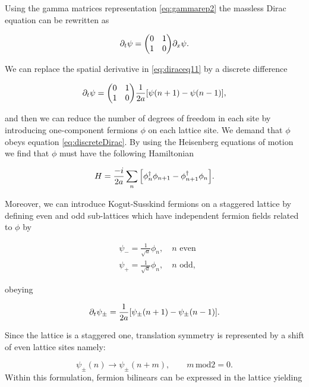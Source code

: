 Using the gamma matrices representation \eqref{eq:gammarep2} the massless Dirac equation can be rewritten as

\begin{equation}
    \partial_t \psi =   \mqty(\admat[0]{1,1})\partial_x \psi.\label{eq:diraceq11}
\end{equation}

We can replace the spatial derivative  in \eqref{eq:diraceq11} by a discrete difference

\begin{equation}
     \partial_t \psi = \mqty(\admat[0]{1,1})\frac{1}{2a}\qty[\psi(n+1) - \psi(n-1)],\label{eq:discreteDirac}
\end{equation}

and then we can reduce the number of degrees of freedom in each site by introducing one-component fermions $\phi$ on each lattice site. We demand that $\phi$ obeys equation \eqref{eq:discreteDirac}. By using the Heisenberg equations of motion we find that $\phi$ must have the following Hamiltonian

\begin{equation}
H = \frac{-i}{2a} \sum_n \qty[\phi^\dagger_n \phi_{n+1} - \phi^\dagger_{n+1}\phi_n].
\end{equation}

Moreover, we can introduce Kogut-Susskind fermions \cite{Banks} on a staggered lattice by defining even and odd sub-lattices which have independent fermion fields related to $\phi$ by

\begin{align}
&\psi_- = \frac{1}{\sqrt a} \phi_n,\quad n\text{ even}\nonumber\\
&\psi_+= \frac{1}{\sqrt a} \phi_n,\quad n\text{ odd},
\end{align}

obeying 

\begin{equation}
    \partial_t \psi_\pm = \frac{1}{2a}\qty[\psi_\pm(n+1) - \psi_\pm(n-1)].
\end{equation}

Since the lattice is a staggered one, translation symmetry is represented by a shift of even lattice sites namely:

\begin{equation}
\psi_\pm(n)\to\psi_\pm(n+m),\quad\quad m\,\text{mod}2 =0.
\end{equation}
Within this formulation, fermion bilinears can be expressed in the lattice yielding


